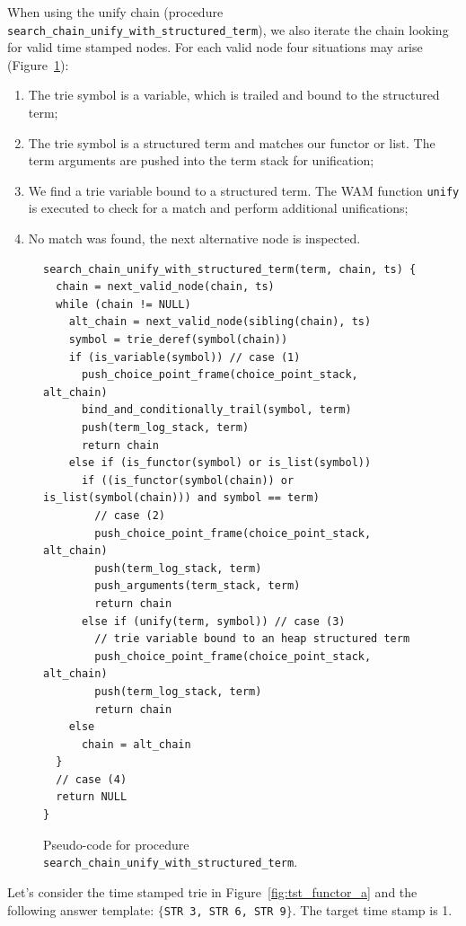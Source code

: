 When using the unify chain (procedure \texttt{search\_chain\_unify\_with\_structured\_term}),
we also iterate the chain looking for valid time stamped nodes. For each valid node
four situations may arise (Figure~\ref{fig:search_chain_unify_with_structured_term}):

\begin{enumerate}
  \item The trie symbol is a variable, which is trailed and bound to the structured term;
  \item The trie symbol is a structured term and matches our functor or list.
  The term arguments are pushed into the term stack for unification;
  \item We find a trie variable bound to a structured term. The WAM function \texttt{unify}
  is executed to check for a match and perform additional unifications;
  \item No match was found, the next alternative node is inspected.
\end{enumerate}

\begin{figure}[ht]
\begin{Verbatim}
search_chain_unify_with_structured_term(term, chain, ts) {
  chain = next_valid_node(chain, ts)
  while (chain != NULL)
    alt_chain = next_valid_node(sibling(chain), ts)
    symbol = trie_deref(symbol(chain))
    if (is_variable(symbol)) // case (1)
      push_choice_point_frame(choice_point_stack, alt_chain)
      bind_and_conditionally_trail(symbol, term)
      push(term_log_stack, term)
      return chain
    else if (is_functor(symbol) or is_list(symbol))
      if ((is_functor(symbol(chain)) or is_list(symbol(chain))) and symbol == term)
        // case (2)
        push_choice_point_frame(choice_point_stack, alt_chain)
        push(term_log_stack, term)
        push_arguments(term_stack, term)
        return chain
      else if (unify(term, symbol)) // case (3)
        // trie variable bound to an heap structured term
        push_choice_point_frame(choice_point_stack, alt_chain)
        push(term_log_stack, term)
        return chain
    else
      chain = alt_chain
  }
  // case (4)
  return NULL
}
\end{Verbatim}
\caption{Pseudo-code for procedure \texttt{search\_chain\_unify\_with\_structured\_term}.}
\label{fig:search_chain_unify_with_structured_term}
\end{figure}

Let's consider the time stamped trie in Figure~\ref{fig:tst_functor_a}
and the following answer template: $\{$\texttt{STR 3, STR 6, STR 9}$\}$.
The target time stamp is 1.

